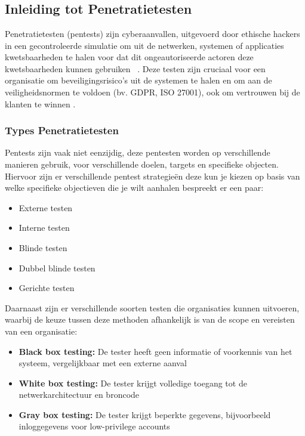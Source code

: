 
\chapter{}
\label{ch:Literatuurstudie}

\section{Inleiding tot Penetratietesten}
Penetratietesten (pentests) zijn cyberaanvallen, uitgevoerd door ethische hackers in een gecontroleerde simulatie om uit de netwerken, systemen of applicaties kwetsbaarheden te halen voor dat dit ongeautoriseerde actoren deze kwetsbaarheden kunnen gebruiken ~\autocite{2_Shebli2018}. Deze testen zijn cruciaal voor een organisatie om beveiligingsrisico's uit de systemen te halen en om aan de veiligheidsnormen te voldoen (bv. GDPR, ISO 27001), ook om vertrouwen bij de klanten te winnen \autocite{3_Dalalana2017}.

\subsection{Types Penetratietesten}
Pentests zijn vaak niet eenzijdig, deze pentesten worden op verschillende manieren gebruik, voor verschillende doelen, targets en specifieke objecten.
Hiervoor zijn er verschillende pentest strategieën deze kun je kiezen op basis van welke specifieke objectieven die je wilt aanhalen \autocite{1_Vats2020} bespreekt er een paar:

\begin{itemize}
    \item Externe testen
    \item Interne testen
    \item Blinde testen
    \item Dubbel blinde testen
    \item Gerichte testen
\end{itemize}

Daarnaast zijn er verschillende soorten testen die organisaties kunnen uitvoeren, waarbij de keuze tussen deze methoden afhankelijk is van de scope en vereisten van een organisatie:

\begin{itemize}
    \item \textbf{Black box testing:} De tester heeft geen informatie of voorkennis van het systeem, vergelijkbaar met een externe aanval
    \item \textbf{White box testing:} De tester krijgt volledige toegang tot de netwerkarchitectuur en broncode
    \item \textbf{Gray box testing:} De tester krijgt beperkte gegevens, bijvoorbeeld inloggegevens voor low-privilege accounts
\end{itemize}
\autocite{9_Khamdamovich2021}


